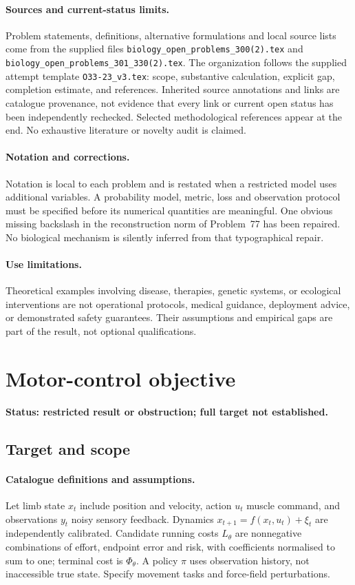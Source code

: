 \documentclass[11pt]{article}
\begin{document}
\paragraph{Sources and current-status limits.}
Problem statements, definitions, alternative formulations and local source lists
come from the supplied files
\texttt{biology\_open\_problems\_300(2).tex} and
\texttt{biology\_open\_problems\_301\_330(2).tex}.
The organization follows the supplied attempt template
\texttt{O33-23\_v3.tex}: scope, substantive calculation, explicit gap,
completion estimate, and references. Inherited source annotations and links are
catalogue provenance, not evidence that every link or current open status has
been independently rechecked. Selected methodological references appear at the
end. No exhaustive literature or novelty audit is claimed.

\paragraph{Notation and corrections.}
Notation is local to each problem and is restated when a restricted model uses
additional variables. A probability model, metric, loss and observation protocol
must be specified before its numerical quantities are meaningful. One obvious
missing backslash in the reconstruction norm of Problem~77 has been repaired.
No biological mechanism is silently inferred from that typographical repair.

\paragraph{Use limitations.}
Theoretical examples involving disease, therapies, genetic systems, or ecological
interventions are not operational protocols, medical guidance, deployment advice,
or demonstrated safety guarantees. Their assumptions and empirical gaps are part
of the result, not optional qualifications.


\section*{Motor-control objective}
\label{prob:114}
\noindent\textbf{Status: restricted result or obstruction; full target not established.}
\subsection{Target and scope}
\paragraph{Catalogue definitions and assumptions.}
Let limb state $x_t$ include position and velocity, action $u_t$ muscle command, and observations $y_t$ noisy sensory feedback. Dynamics $x_{t+1}=f(x_t,u_t)+\xi_t$ are independently calibrated. Candidate running costs $L_\theta$ are nonnegative combinations of effort, endpoint error and risk, with coefficients normalised to sum to one; terminal cost is $\Phi_\theta$. A policy $\pi$ uses observation history, not inaccessible true state. Specify movement tasks and force-field perturbations.
\end{document}
